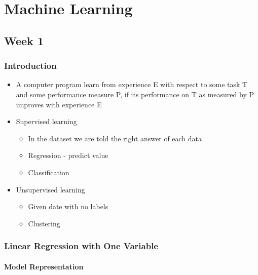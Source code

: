 \documentclass[]{article}
\date{}
\providecommand{\tightlist}{%
  \setlength{\itemsep}{0pt}\setlength{\parskip}{0pt}}
\let\oldparagraph\paragraph
\renewcommand{\paragraph}[1]{\oldparagraph{#1}\mbox{}}
\begin{document}
\hypertarget{machine-learning}{%
\section{Machine Learning}\label{machine-learning}}

\hypertarget{week-1}{%
\subsection{Week 1}\label{week-1}}

\hypertarget{introduction}{%
\subsubsection{Introduction}\label{introduction}}

\begin{itemize}
\tightlist
\item
  A computer program learn from experience E with respect to some task T
  and some performance measure P, if its performance on T as measured by
  P improves with experience E
\item
  Supervised learning

  \begin{itemize}
  \tightlist
  \item
    In the dataset we are told the right answer of each data
  \item
    Regression - predict value
  \item
    Classification
  \end{itemize}
\item
  Unsupervised learning

  \begin{itemize}
  \tightlist
  \item
    Given date with no labels
  \item
    Clustering
  \end{itemize}
\end{itemize}

\hypertarget{linear-regression-with-one-variable}{%
\subsubsection{Linear Regression with One
Variable}\label{linear-regression-with-one-variable}}

\hypertarget{model-representation}{%
\paragraph{Model Representation}\label{model-representation}}
\end{document}
